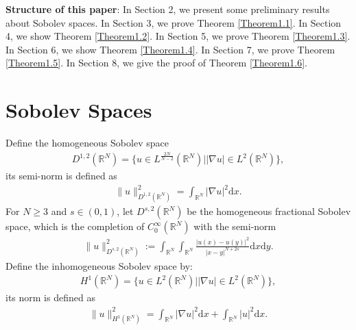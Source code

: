 \documentclass[12pt,a4paper,reqno]{amsart}
\numberwithin{equation}{section}
\begin{document}
\noindent
{\bf Structure of this paper}: In Section 2, we present some  preliminary results about Sobolev spaces.
In Section 3, we prove Theorem \ref{Theorem1.1}.
In Section 4,
we show Theorem \ref{Theorem1.2}.
In Section 5,
we prove Theorem \ref{Theorem1.3}.
In Section 6, we show Theorem \ref{Theorem1.4}.
In Section 7, we prove Theorem \ref{Theorem1.5}.
In Section 8, we give the proof of Theorem  \ref{Theorem1.6}.

\section{Sobolev Spaces}
Define the homogeneous Sobolev space
\begin{equation*}
\begin{aligned}
D^{1,2}(\mathbb{R}^{N})
=
\{u\in L^{\frac{2N}{N-2}}(\mathbb{R}^{N})|
|\nabla u|\in L^{2}(\mathbb{R}^{N})\},
\end{aligned}
\end{equation*}
its semi-norm is defined as
\begin{equation*}
\begin{aligned}
\|u\|_{D^{1,2}
(\mathbb{R}^{N})}^{2}
=\int_{\mathbb{R}^{N}}
|\nabla u|^{2}
\mathrm{d}x.
\end{aligned}
\end{equation*}
For $N\geqslant 3$ and $s\in(0,1)$, let $D^{s,2}(\mathbb{R}^{N})$ be the homogeneous fractional Sobolev space, which is the completion of $C_{0}^{\infty}(\mathbb{R}^{N})$ with the semi-norm
\begin{equation*}
\begin{aligned}
\|u\|_{D^{s,2}(\mathbb{R}^{N})}^{2}:=
\int_{\mathbb{R}^{N}}\int_{\mathbb{R}^{N}}\frac{|u(x)-u(y)|^{2}}{|x-y|^{N+2s}}\mathrm{d}x\mathrm{d}y.
\end{aligned}
\end{equation*}
Define the inhomogeneous Sobolev space by:
\begin{equation*}
\begin{aligned}
H^{1}(\mathbb{R}^{N})
=
\{u\in L^{2}(\mathbb{R}^{N})|
|\nabla u|\in L^{2}(\mathbb{R}^{N})\},
\end{aligned}
\end{equation*}
its norm is defined as
\begin{equation*}
\begin{aligned}
\|u\|_{H^{1}(\mathbb{R}^{N})}^{2}
=
\int_{\mathbb{R}^{N}}
|\nabla u|^{2}
\mathrm{d}x
+
\int_{\mathbb{R}^{N}}
|u|^{2}
\mathrm{d}x.
\end{aligned}
\end{equation*}
\end{document}
